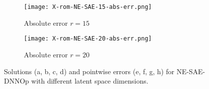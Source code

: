 \begin{figure}[!htb]
\begin{center}
\begin{subfigure}[b]{0.23\textwidth}
        \end{subfigure}   
        \begin{subfigure}[b]{0.23\textwidth}
            \begin{center}
                \texttt{[image: X-rom-NE-SAE-15-abs-err.png]}
            \end{center}
            \caption{Absolute error $r = 15$}
        \end{subfigure}    
        \begin{subfigure}[b]{0.23\textwidth}
            \begin{center}
                \texttt{[image: X-rom-NE-SAE-20-abs-err.png]}
            \end{center}
            \caption{Absolute error $r = 20$}
        \end{subfigure}
     \end{center}
     \caption[Solutions and pointwise errors for NE-SAE-DNNOp.]{Solutions (a, b, c, d) and pointwise errors (e, f, g, h) for NE-SAE-DNNOp with different latent space dimensions.}
        \label{fig: nesae-burger}
\end{figure}

